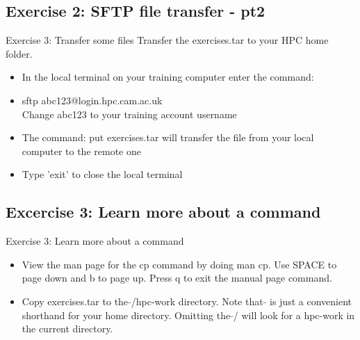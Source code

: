 \subsection{Exercise 2: SFTP file transfer - pt2}
\begin{frame}{Exercise 3: Transfer some files}
Transfer the exercises.tar to your HPC home folder.
\begin{itemize}
\item{In the local terminal on your training computer enter the command:}
\item \alert{\footnotesize sftp abc123@login.hpc.cam.ac.uk}\\
Change abc123 to your training account username
\item{The command: \alert{\footnotesize put exercises.tar} will transfer the file from your local computer to the remote one}
\item Type 'exit' to close the local terminal
\end{itemize}
\end{frame}

\subsection{Excercise 3: Learn more about a command}
\begin{frame}{Exercise 3: Learn more about a command}
\begin{itemize}
\item[(a)]{View the man page for the \alert{cp} command by doing \alert{man cp}. Use \alert{SPACE} to page down and \alert{b} to page up. Press \alert{q} to exit the manual page command.}

\item[(b)]{Copy \alert{exercises.tar} to the $\tilde{}$/hpc-work directory. Note that $\tilde{}$ is just a convenient shorthand for your home directory. Omitting the $\tilde{}$/ will look for a hpc-work in the current directory.}
\end{itemize}
 \end{frame}

